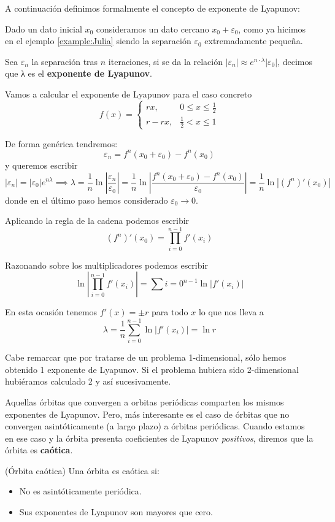 A continuación definimos formalmente el concepto de exponente  de Lyapunov:

\begin{definition}
Dado un dato inicial $x_0$ consideramos un dato cercano $x_0+ε_0$, como ya hicimos en el ejemplo \ref{example:Julia} siendo la separación $ε_0$ extremadamente pequeña.

Sea $ε_n$ la separación tras $n$ iteraciones, si se da la relación $|ε_n|\approx e^{n\cdot λ}|ε_0|$, decimos que λ es el \textbf{exponente de Lyapunov}.
\end{definition}

\begin{example}
Vamos a calcular el exponente de Lyapunov para el caso concreto
\[f(x) = \left\{ \begin{array}{ll}
rx, & 0 \leq x \leq \frac{1}{2}\\
r-rx, & \frac{1}{2} < x \leq 1
\end{array}\right.\]

De forma genérica tendremos:
\[ε_n = f^n(x_0+ε_0)-f^n(x_0) \]
y queremos escribir
\[|ε_n| = |ε_0| e^{nλ} \implies λ = \frac{1}{n} \ln\left| \frac{ε_n}{ε_0}\right| = \frac{1}{n}\ln \left|\frac{f^n(x_0+ε_0)-f^n(x_0)}{ε_0} \right| = \frac{1}{n}\ln \left|(f^n)'(x_0) \right|\]
donde en el último paso hemos considerado $ε_0 \to 0$.

Aplicando la regla de la cadena podemos escribir
\[(f^n)'(x_0) = \prod_{i=0}^{n-1}f'(x_i) \]

Razonando sobre los multiplicadores podemos escribir
\[\ln \left|\prod_{i=0}^{n-1}f'(x_i)\right| = \sum{i=0}^{n-1}\ln |f'(x_i)| \]

En esta ocasión tenemos $f'(x)=\pm r$ para todo $x$ lo que nos lleva a
\[λ= \frac{1}{n}\sum_{i=0}^{n-1}\ln |f'(x_i)| = \ln r\]
\end{example}

Cabe remarcar que por tratarse de un problema 1-dimensional, sólo hemos obtenido 1 exponente de Lyapunov. Si el problema hubiera sido 2-dimensional hubiéramos calculado 2 y así sucesivamente.

Aquellas órbitas que convergen a orbitas periódicas comparten los mismos exponentes de Lyapunov. Pero, más interesante es el caso de órbitas que no convergen asintóticamente (a largo plazo) a órbitas periódicas. Cuando estamos en ese caso y la órbita presenta coeficientes de Lyapunov \emph{positivos}, diremos que la órbita es \textbf{caótica}.

\begin{definition}(Órbita caótica)
Una órbita es caótica si:
\begin{itemize}
\item No es asintóticamente periódica.
\item Sus exponentes de Lyapunov son mayores que cero.
\end{itemize}
\end{definition}

